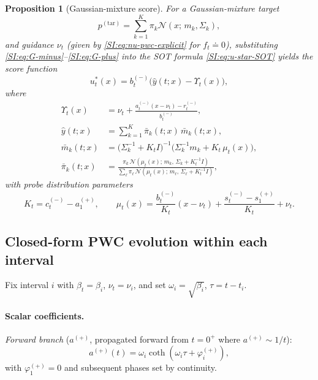 \documentclass[11pt,onecolumn]{article}
\newcommand{\calN}{\mathcal{N}}
\newcommand{\ptar}{p^{(\mathrm{tar})}}
\newtheorem{proposition}[theorem]{Proposition}
\begin{document}
\begin{proposition}[Gaussian-mixture score]
\label{prop:gm-score}
For a Gaussian-mixture target
$$\ptar = \sum_{k=1}^K \pi_k\calN(x;\,m_k,\Sigma_k),$$
and guidance $\nu_t$ (given by \eqref{SI:eq:nu-pwc-explicit}
for $f_t\doteq 0$),
substituting \eqref{SI:eq:G-minus}--\eqref{SI:eq:G-plus} into the SOT
formula \eqref{SI:eq:u-star-SOT} yields the score function
\begin{equation}
  u_t^*(x) = b_t^{(-)}\bigl(\hat y(t;x) - \Upsilon_t(x)\bigr),
  \label{SI:eq:score-gm}
\end{equation}
where
\begin{align}
  \Upsilon_t(x)
  &= \nu_t + \frac{a_t^{(-)}(x-\nu_t) - r_t^{(-)}}{b_t^{(-)}},
  \label{SI:eq:Upsilon}\\
  \hat y(t;x)
  &= \sum_{k=1}^K \bar\pi_k(t;x)\,\bar m_k(t;x),
  \label{SI:eq:yhat}\\
  \bar m_k(t;x)
  &= \bigl(\Sigma_k^{-1} + K_t I\bigr)^{-1}
     \bigl(\Sigma_k^{-1}m_k + K_t\,\mu_t(x)\bigr),
  \label{SI:eq:mk-bar}\\
  \bar\pi_k(t;x)
  &= \frac{\pi_k\,\calN(\mu_t(x);\,m_k,\,\Sigma_k + K_t^{-1}I)}
          {\sum_\ell\pi_\ell\,\calN(\mu_t(x);\,m_\ell,\,\Sigma_\ell + K_t^{-1}I)},
  \label{SI:eq:pik-bar}
\end{align}
with probe distribution parameters
\begin{equation}
  K_t = c_t^{(-)} - a_1^{(+)},
  \qquad
  \mu_t(x)
  = \frac{b_t^{(-)}}{K_t}(x-\nu_t)
    + \frac{s_t^{(-)} - s_1^{(+)}}{K_t} + \nu_t.
  \label{SI:eq:Kt-mut}
\end{equation}
\end{proposition}

\subsection{Closed-form PWC evolution within each interval}
\label{SI:quad:closedforms}

Fix interval $i$ with $\beta_t=\beta_i$, $\nu_t=\nu_i$, and set
$\omega_i=\sqrt{\beta_i}$, $\tau=t-t_i$.

\paragraph{Scalar coefficients.}
\textit{Forward branch} ($a^{(+)}$, propagated forward from
$t=0^+$ where $a^{(+)}\sim 1/t$):
\begin{equation}
  a^{(+)}(t) = \omega_i\coth(\omega_i\tau + \varphi_i^{(+)}),
  \label{SI:eq:a-plus-pwc}
\end{equation}
with $\varphi_1^{(+)}=0$ and subsequent phases set by continuity.
\end{document}
